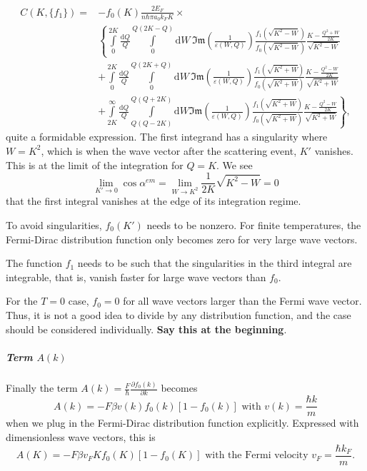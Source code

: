 \documentclass[physics,phd,nolot,nolof]{uccthesis}%
\newcommand{\alert}[1]{\textbf{\color{red}#1}}
\begin{document}
{\begin{equation}
  \begin{split}
  C(K,\{f_1\})=
&  -f_0(K)
    \frac{2E_F}{n\hbar \pi a_0k_F K} \times\\
&  \left\{
\int\limits_0^{2K} \frac{\mathrm{d}Q}{Q}
  \int\limits_{0}^{Q\left(2K-Q\right)}\!\!\!\!\!\!\mathrm{d}W\,
\mathfrak{Im}\left(\frac{1}{\varepsilon(W,Q)}\right) 
\frac{f_1\left(\sqrt{K^2-W}\right)}{f_0\left(\sqrt{K^2-W}\right)} 
\frac{K-\frac{Q^2+W}{2K}}{\sqrt{K^2-W}}
\right.\\
&\left. +\int\limits_0^{2K} \frac{\mathrm{d}Q}{Q}
  \int\limits_{0}^{Q\left(2K+Q\right)}\!\!\!\!\!\!\mathrm{d}W\,
\mathfrak{Im}\left(\frac{1}{\varepsilon(W,Q)}\right) 
\frac{f_1\left(\sqrt{K^2+W}\right)}{f_0\left(\sqrt{K^2+W}\right)} 
\frac{K-\frac{Q^2-W}{2K}}{\sqrt{K^2+W}}
\right.\\
&\left. +\int\limits_{2K}^\infty \frac{\mathrm{d}Q}{Q}
  \int\limits_{Q\left(Q-2K\right)}^{Q\left(Q+2K\right)}\!\!\!\!\!\!\mathrm{d}W
\mathfrak{Im}\left(\frac{1}{\varepsilon(W,Q)}\right) 
\frac{f_1\left(\sqrt{K^2+W}\right)}{f_0\left(\sqrt{K^2+W}\right)} 
\frac{K-\frac{Q^2-W}{2K}}{\sqrt{K^2+W}}
\right\},
\end{split}
  \label{eq:CK}
\end{equation}
quite a formidable expression.
The first integrand has a singularity where $W=K^2$, which is when the
wave vector after the scattering event, $K'$ vanishes.
This is at the limit of the integration for $Q=K$.
We see 
\begin{equation}
  \lim\limits_{K'\to0} \cos\alpha^{em}
  =\lim\limits_{W\to K^2} \frac{1}{2K}\sqrt{K^2-W}=0
  \label{eq:cosalphaKprimezero}
\end{equation}
that the first integral vanishes at the edge of its integration regime.

To avoid singularities, $f_0(K')$ needs to be nonzero. 
For finite temperatures, the Fermi-Dirac distribution function 
only becomes zero for very large wave vectors.

The function $f_1$ needs to be such that the singularities 
in the third integral are integrable, that is, vanish faster for large 
wave vectors than $f_0$.

For the $T=0$ case, $f_0 =0$  for all wave vectors larger than the Fermi
wave vector. Thus, it is not a good idea to divide by any distribution 
function, and the case should be considered individually.
\alert{Say this at the beginning}.
\subparagraph*{Term $A(k)$}
Finally the term $A(k)=\frac{F}{\hbar}\frac{\partial f_0(k)}{\partial k}$
becomes
\begin{equation}
  A(k)=-F\beta v(k) f_0(k)\left[1-f_0(k)\right]
  \text{ with } v(k) = \frac{\hbar k}{m}
  \label{eq:Ak}
\end{equation}
when we plug in the Fermi-Dirac distribution function explicitly.
Expressed with dimensionless wave vectors, this is
\begin{equation}
  A(K)=-F\beta v_F K f_0(K)\left[1-f_0(K)\right]
  \text{ with the Fermi velocity } v_F = \frac{\hbar k_F}{m}.
  \label{eq:AK}
\end{equation}
}
\end{document}
